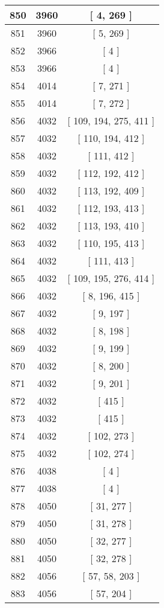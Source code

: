 \begin{center}
\begin{longtable}[H]{|| c c c ||}
850 & 3960 & [ 4, 269 ] \\ 
\hline
851 & 3960 & [ 5, 269 ] \\ 
\hline
852 & 3966 & [ 4 ] \\ 
\hline
853 & 3966 & [ 4 ] \\ 
\hline
854 & 4014 & [ 7, 271 ] \\ 
\hline
855 & 4014 & [ 7, 272 ] \\ 
\hline
856 & 4032 & [ 109, 194, 275, 411 ] \\ 
\hline
857 & 4032 & [ 110, 194, 412 ] \\ 
\hline
858 & 4032 & [ 111, 412 ] \\ 
\hline
859 & 4032 & [ 112, 192, 412 ] \\ 
\hline
860 & 4032 & [ 113, 192, 409 ] \\ 
\hline
861 & 4032 & [ 112, 193, 413 ] \\ 
\hline
862 & 4032 & [ 113, 193, 410 ] \\ 
\hline
863 & 4032 & [ 110, 195, 413 ] \\ 
\hline
864 & 4032 & [ 111, 413 ] \\ 
\hline
865 & 4032 & [ 109, 195, 276, 414 ] \\ 
\hline
866 & 4032 & [ 8, 196, 415 ] \\ 
\hline
867 & 4032 & [ 9, 197 ] \\ 
\hline
868 & 4032 & [ 8, 198 ] \\ 
\hline
869 & 4032 & [ 9, 199 ] \\ 
\hline
870 & 4032 & [ 8, 200 ] \\ 
\hline
871 & 4032 & [ 9, 201 ] \\ 
\hline
872 & 4032 & [ 415 ] \\ 
\hline
873 & 4032 & [ 415 ] \\ 
\hline
874 & 4032 & [ 102, 273 ] \\ 
\hline
875 & 4032 & [ 102, 274 ] \\ 
\hline
876 & 4038 & [ 4 ] \\ 
\hline
877 & 4038 & [ 4 ] \\ 
\hline
878 & 4050 & [ 31, 277 ] \\ 
\hline
879 & 4050 & [ 31, 278 ] \\ 
\hline
880 & 4050 & [ 32, 277 ] \\ 
\hline
881 & 4050 & [ 32, 278 ] \\ 
\hline
882 & 4056 & [ 57, 58, 203 ] \\ 
\hline
883 & 4056 & [ 57, 204 ] \\ 

\end{longtable}
\end{center}
